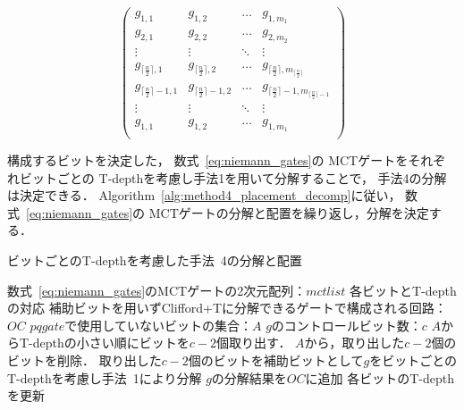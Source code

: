 \begin{equation}\label{eq:niemann_gates}
  \begin{pmatrix}
    g_{1,1} & g_{1,2} & \dots & g_{1,m_{1}} \\
    g_{2,1} & g_{2,2} & \dots & g_{2,m_{2}} \\
    \vdots & \vdots & \ddots & \vdots \\
    g_{\lceil \frac{n}{2} \rceil,1} & g_{\lceil \frac{n}{2} \rceil,2} & \dots & g_{\lceil \frac{n}{2} \rceil,m_{\lceil \frac{n}{2} \rceil}}\\
    g_{\lceil \frac{n}{2} \rceil -1, 1} & g_{\lceil \frac{n}{2}  \rceil-1 ,2}& \dots & g_{\lceil \frac{n}{2} \rceil-1 ,m_{\lceil \frac{n}{2} \rceil-1}}\\
    \vdots & \vdots & \ddots &\vdots \\
    g_{1,1} & g_{1,2} & \dots & g_{1,m_{1}} \\
  \end{pmatrix}
\end{equation}
\par
構成するビットを決定した，
数式~\ref{eq:niemann_gates}の
MCTゲートをそれぞれビットごとの
T-depthを考慮し手法1を用いて分解することで，
手法4の分解は決定できる．
Algorithm~\ref{alg:method4_placement_decomp}に従い，
数式~\ref{eq:niemann_gates}の
MCTゲートの分解と配置を繰り返し，分解を決定する．
\begin{algorithm}[tbp]
  \caption{ビットごとのT-depthを考慮した手法~4の分解と配置}
  \label{alg:method4_placement_decomp}
  \begin{algorithmic}[1]
    \Require 数式~\ref{eq:niemann_gates}のMCTゲートの2次元配列：$mctlist$
    \Require 各ビットとT-depthの対応
    \Ensure 補助ビットを用いずClifford+Tに分解できるゲートで構成される回路：$OC$
    \State $pqgate$で使用していないビットの集合：$A$
      \State $g$のコントロールビット数：$c$
      \State $A$からT-depthの小さい順にビットを$c-2$個取り出す．
      \State $A$から，取り出した$c-2$個のビットを削除．
      \State 取り出した$c-2$個のビットを補助ビットとして$g$をビットごとのT-depthを考慮し手法~1により分解
      \State $g$の分解結果を$OC$に追加
    \EndFor
      \State 各ビットのT-depthを更新
    \EndFor
  \end{algorithmic}
\end{algorithm}
\par
